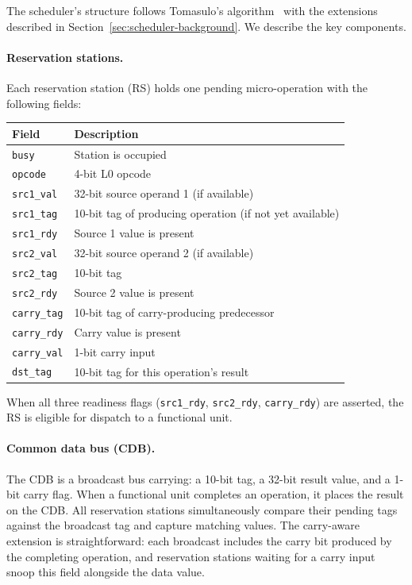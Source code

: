 \documentclass[11pt,a4paper]{article}
\begin{document}
The scheduler's structure follows Tomasulo's algorithm~\cite{tomasulo1967}
with the extensions described in Section~\ref{sec:scheduler-background}.  We
describe the key components.

\paragraph{Reservation stations.}
Each reservation station (RS) holds one pending micro-operation with the
following fields:

\begin{center}
\begin{tabular}{@{}lp{8cm}@{}}
\toprule
Field & Description \\
\midrule
\texttt{busy}       & Station is occupied \\
\texttt{opcode}     & 4-bit L0 opcode \\
\texttt{src1\_val}  & 32-bit source operand 1 (if available) \\
\texttt{src1\_tag}  & 10-bit tag of producing operation (if not yet available) \\
\texttt{src1\_rdy}  & Source 1 value is present \\
\texttt{src2\_val}  & 32-bit source operand 2 (if available) \\
\texttt{src2\_tag}  & 10-bit tag \\
\texttt{src2\_rdy}  & Source 2 value is present \\
\texttt{carry\_tag} & 10-bit tag of carry-producing predecessor \\
\texttt{carry\_rdy} & Carry value is present \\
\texttt{carry\_val} & 1-bit carry input \\
\texttt{dst\_tag}   & 10-bit tag for this operation's result \\
\bottomrule
\end{tabular}
\end{center}

When all three readiness flags (\texttt{src1\_rdy}, \texttt{src2\_rdy},
\texttt{carry\_rdy}) are asserted, the RS is eligible for dispatch to a
functional unit.

\paragraph{Common data bus (CDB).}
The CDB is a broadcast bus carrying: a 10-bit tag, a 32-bit result value,
and a 1-bit carry flag.  When a functional unit completes an operation, it
places the result on the CDB.  All reservation stations simultaneously
compare their pending tags against the broadcast tag and capture matching
values.  The carry-aware extension is straightforward: each broadcast
includes the carry bit produced by the completing operation, and reservation
stations waiting for a carry input snoop this field alongside the data value.
\end{document}
